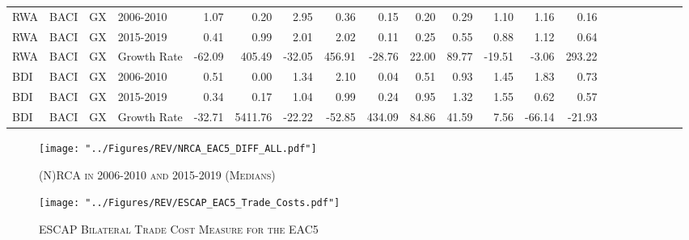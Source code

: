 \documentclass[a4paper]{article}
\begin{document}
\begin{table}[ht]
{\begin{tabular}{llllrrrrrrrrrrrrrrrrr}
  RWA & BACI & GX & 2006-2010 & 1.07 & 0.20 & 2.95 & 0.36 & 0.15 & 0.20 & 0.29 & 1.10 & 1.16 & 0.16 &  &  &  &  &  &  &  \\ 
  RWA & BACI & GX & 2015-2019 & 0.41 & 0.99 & 2.01 & 2.02 & 0.11 & 0.25 & 0.55 & 0.88 & 1.12 & 0.64 &  &  &  &  &  &  &  \\ 
  RWA & BACI & GX & Growth Rate & -62.09 & 405.49 & -32.05 & 456.91 & -28.76 & 22.00 & 89.77 & -19.51 & -3.06 & 293.22 &  &  &  &  &  &  &  \\ 
  BDI & BACI & GX & 2006-2010 & 0.51 & 0.00 & 1.34 & 2.10 & 0.04 & 0.51 & 0.93 & 1.45 & 1.83 & 0.73 &  &  &  &  &  &  &  \\ 
  BDI & BACI & GX & 2015-2019 & 0.34 & 0.17 & 1.04 & 0.99 & 0.24 & 0.95 & 1.32 & 1.55 & 0.62 & 0.57 &  &  &  &  &  &  &  \\ 
  BDI & BACI & GX & Growth Rate & -32.71 & 5411.76 & -22.22 & -52.85 & 434.09 & 84.86 & 41.59 & 7.56 & -66.14 & -21.93 &  &  &  &  &  &  &  \\ \bottomrule
\end{tabular}
}
\end{table}


\begin{figure}[h!]
\centering
\caption{\label{fig:NRCA_Diff}\textsc{(N)RCA in 2006-2010 and 2015-2019 (Medians)}}
\texttt{[image: "../Figures/REV/NRCA\_EAC5\_DIFF\_ALL.pdf"]} \end{figure}
\FloatBarrier


\begin{figure}[h!] \vspace{-0.5cm}
\centering
\caption{\label{fig:ESCAP_EAC}\textsc{ESCAP Bilateral Trade Cost Measure for the EAC5}}
\texttt{[image: "../Figures/REV/ESCAP\_EAC5\_Trade\_Costs.pdf"]} \vspace{-1cm}
\end{figure}
\FloatBarrier
\end{document}
